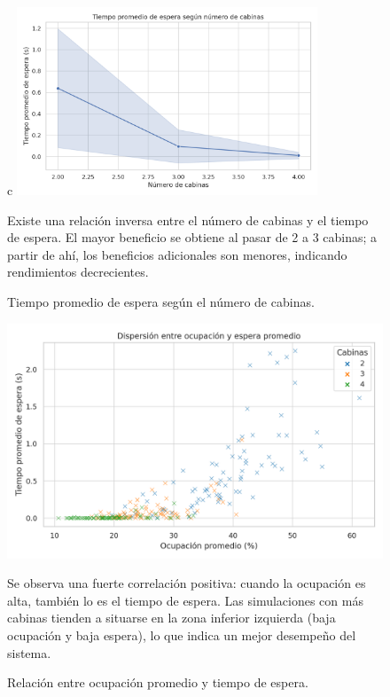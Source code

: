 \documentclass[12pt]{article}
\begin{document}
\begin{figure}[H]c
\centering\vspace{-0.5em}
\includegraphics[width=0.8\textwidth]{line_espera.png}
\caption{Tiempo promedio de espera según el número de cabinas.}
\small Existe una relación inversa entre el número de cabinas y el tiempo de espera. El mayor beneficio se obtiene al pasar de 2 a 3 cabinas; a partir de ahí, los beneficios adicionales son menores, indicando rendimientos decrecientes.
\end{figure}

\begin{figure}[H]
\centering\vspace{2.0em}
\includegraphics[width=1.0\textwidth]{scatter_ocupacion.png}
\caption{Relación entre ocupación promedio y tiempo de espera.}
\small Se observa una fuerte correlación positiva: cuando la ocupación es alta, también lo es el tiempo de espera. Las simulaciones con más cabinas tienden a situarse en la zona inferior izquierda (baja ocupación y baja espera), lo que indica un mejor desempeño del sistema.

\end{figure}
\end{document}
